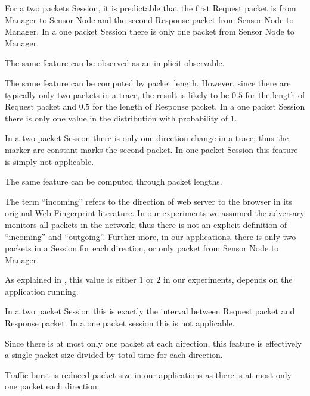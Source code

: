 \begin{description}[style=nextline]
	\item[Direction]
	For a two packets Session, it is predictable that the first Request packet is from Manager to Sensor Node and the second Response packet from Sensor Node to Manager. In a one packet Session there is only one packet from Sensor Node to Manager.
	
	\item[Length]
	The same feature can be observed as an implicit observable.
	
	\item[Frequency Distribution of Length]
	The same feature can be computed by packet length. However, since there are typically only two packets in a trace, the result is likely to be $0.5$ for the length of Request packet and $0.5$ for the length of Response packet. In a one packet Session there is only one value in the distribution with probability of $1$.
	
	\item[Size, HTML and Number Markers]
	In a two packet Session there is only one direction change in a trace; thus the marker are constant marks the second packet. In one packet Session this feature is simply not applicable.
	
	\item[Total Bytes]
	The same feature can be computed through packet lengths.
	
	\item[Percentage Incoming Packets]
	The term ``incoming'' refers to the direction of web server to the browser in its original Web Fingerprint literature. In our experiments we assumed the adversary monitors all packets in the network; thus there is not an explicit definition of ``incoming'' and ``outgoing''. Further more, in our applications, there is only two packets in a Session for each direction, or only packet from Sensor Node to Manager.
	
	\item[Number of Packets]
	As explained in , this value is either $1$ or $2$ in our experiments, depends on the application running. 
	
	\item[Total Time]
	In a two packet Session this is exactly the interval between Request packet and Response packet. In a one packet session this is not applicable.
	
	\item[Total Per-direction Bandwidth]
	Since there is at most only one packet at each direction, this feature is effectively a single packet size divided by total time for each direction.
	
	\item[Traffic Burst]
	Traffic burst is reduced packet size in our applications as there is at most only one packet each direction.
\end{description}

